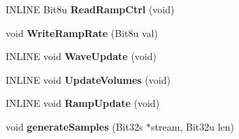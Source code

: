 \begin{DoxyCompactItemize}
\item 
\hypertarget{classGUSChannels_a67542e94a74547308f3cebe839dff17e}{I\-N\-L\-I\-N\-E Bit8u {\bfseries Read\-Ramp\-Ctrl} (void)}\label{classGUSChannels_a67542e94a74547308f3cebe839dff17e}

\item 
\hypertarget{classGUSChannels_a81dca3a9a68b6e1bb466d5ded2a0a6d4}{void {\bfseries Write\-Ramp\-Rate} (Bit8u val)}\label{classGUSChannels_a81dca3a9a68b6e1bb466d5ded2a0a6d4}

\item 
\hypertarget{classGUSChannels_a53df82759ffc2b824cfa3a50d76f265b}{I\-N\-L\-I\-N\-E void {\bfseries Wave\-Update} (void)}\label{classGUSChannels_a53df82759ffc2b824cfa3a50d76f265b}

\item 
\hypertarget{classGUSChannels_add1d0b84f2f784afae363fa360ee414e}{I\-N\-L\-I\-N\-E void {\bfseries Update\-Volumes} (void)}\label{classGUSChannels_add1d0b84f2f784afae363fa360ee414e}

\item 
\hypertarget{classGUSChannels_a97d0c92f732774254834ddd0e23b6281}{I\-N\-L\-I\-N\-E void {\bfseries Ramp\-Update} (void)}\label{classGUSChannels_a97d0c92f732774254834ddd0e23b6281}

\item 
\hypertarget{classGUSChannels_a2ca162860f106821202ca051cf6c75f2}{void {\bfseries generate\-Samples} (Bit32s $\ast$stream, Bit32u len)}\label{classGUSChannels_a2ca162860f106821202ca051cf6c75f2}

\end{DoxyCompactItemize}
